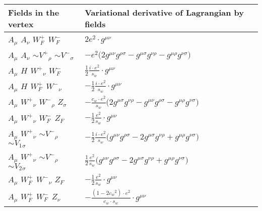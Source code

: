 \begin{center}
\begin{tabular}{|l|l|} \hline
Fields in the vertex & Variational derivative of Lagrangian by fields \\ \hline
${A}_{\mu }$ \phantom{-} ${A}_{\nu }$ \phantom{-} $W^+_F{}_{}$ \phantom{-} $W^-_F{}_{}$ \phantom{-}  &
	$2 e{}^2 \cdot g^{\mu \nu} $\\[2mm]
${A}_{\mu }$ \phantom{-} ${A}_{\nu }$ \phantom{-} $\sim V^+{}_{\rho }$ \phantom{-} $\sim V^-{}_{\sigma }$ \phantom{-}  &
	$- e{}^2 \big(2g^{\mu \nu} g^{\rho \sigma} -g^{\mu \sigma} g^{\nu \rho} -g^{\mu \rho} g^{\nu \sigma} \big)$\\[2mm]
${A}_{\mu }$ \phantom{-} ${H}_{}$ \phantom{-} $W^+{}_{\nu }$ \phantom{-} $W^-_F{}_{}$ \phantom{-}  &
	$\frac{1}{2}\frac{ i \cdot e{}^2 }{ s_w}\cdot g^{\mu \nu} $\\[2mm]
${A}_{\mu }$ \phantom{-} ${H}_{}$ \phantom{-} $W^+_F{}_{}$ \phantom{-} $W^-{}_{\nu }$ \phantom{-}  &
	$-\frac{1}{2}\frac{ i \cdot e{}^2 }{ s_w}\cdot g^{\mu \nu} $\\[2mm]
${A}_{\mu }$ \phantom{-} $W^+{}_{\nu }$ \phantom{-} $W^-{}_{\rho }$ \phantom{-} ${Z}_{\sigma }$ \phantom{-}  &
	$-\frac{ c_w \cdot e{}^2 }{ s_w}\big(2g^{\mu \sigma} g^{\nu \rho} -g^{\mu \nu} g^{\rho \sigma} -g^{\mu \rho} g^{\nu \sigma} \big)$\\[2mm]
${A}_{\mu }$ \phantom{-} $W^+{}_{\nu }$ \phantom{-} $W^-_F{}_{}$ \phantom{-} $Z_F{}_{}$ \phantom{-}  &
	$-\frac{1}{2}\frac{ e{}^2 }{ s_w}\cdot g^{\mu \nu} $\\[2mm]
${A}_{\mu }$ \phantom{-} $W^+{}_{\nu }$ \phantom{-} $\sim V^-{}_{\rho }$ \phantom{-} $\sim V_1{}_{\sigma }$ \phantom{-}  &
	$-\frac{1}{2}\frac{ i \cdot e{}^2 }{ s_w}\big(g^{\mu \nu} g^{\rho \sigma} -2g^{\mu \sigma} g^{\nu \rho} +g^{\mu \rho} g^{\nu \sigma} \big)$\\[2mm]
${A}_{\mu }$ \phantom{-} $W^+{}_{\nu }$ \phantom{-} $\sim V^-{}_{\rho }$ \phantom{-} $\sim V_2{}_{\sigma }$ \phantom{-}  &
	$\frac{1}{2}\frac{ e{}^2 }{ s_w}\big(g^{\mu \nu} g^{\rho \sigma} -2g^{\mu \sigma} g^{\nu \rho} +g^{\mu \rho} g^{\nu \sigma} \big)$\\[2mm]
${A}_{\mu }$ \phantom{-} $W^+_F{}_{}$ \phantom{-} $W^-{}_{\nu }$ \phantom{-} $Z_F{}_{}$ \phantom{-}  &
	$-\frac{1}{2}\frac{ e{}^2 }{ s_w}\cdot g^{\mu \nu} $\\[2mm]
${A}_{\mu }$ \phantom{-} $W^+_F{}_{}$ \phantom{-} $W^-_F{}_{}$ \phantom{-} ${Z}_{\nu }$ \phantom{-}  &
	$-\frac{ (1-2 c_w {}^2) \cdot e{}^2 }{ c_w \cdot s_w}\cdot g^{\mu \nu} $\\[2mm]

\end{tabular}
\end{center}
